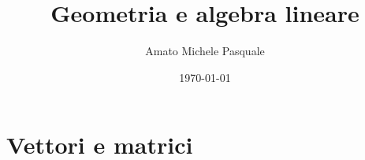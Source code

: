 \documentclass[a4paper,12pt]{article}
\title{\huge Geometria e algebra lineare}
\author{Amato Michele Pasquale}
\date{\today}
\renewcommand{\(}{\left(}
\renewcommand{\)}{\right)}
\begin{document}
\maketitle
\vfill
\begin{center}
  \emph{}
\end{center}
\newpage
{}
\tableofcontents
\newpage
{}
\part{Vettori e matrici}

\end{document}
